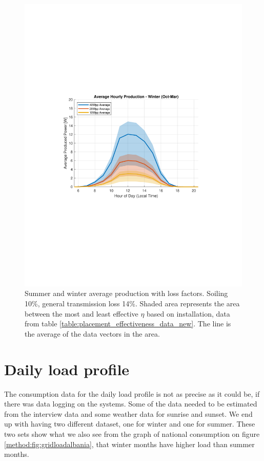 \begin{figure}[H]
\begin{minipage}[t]{0.48\textwidth}
        \includegraphics[width=\linewidth]{photos/Average_production_with_eta&soiling&loss_shaded_allPanels_Winter.pdf} %
    \end{minipage}
    \caption{Summer and winter average production with loss factors. Soiling 10\%, general transmission loss 14\%. Shaded area represents the area between the most and least effective $\eta$ based on installation, data from table \ref{table:placement_effectiveness_data_new}. The line is the average of the data vectors in the area.}
    \label{result:fig:Production_Simulation_results_summer&winter}
\end{figure}


\section{Daily load profile}
The consumption data for the daily load profile is not as precise as it could be, if there was data logging on the systems. Some of the data needed to be estimated from the interview data and some weather data for sunrise and sunset. We end up with having two different dataset, one for winter and one for summer. These two sets show what we also see from the graph of national consumption on figure \ref{method:fig:gridloadalbania}, that winter months have higher load than summer months. 
